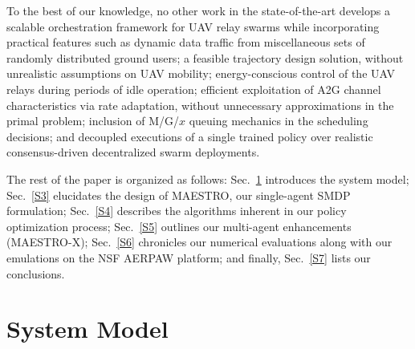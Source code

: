 \documentclass[10pt, twocolumn]{IEEEtran}
\theoremstyle{plain}
\theoremstyle{definition}
\theoremstyle{remark}
\begin{document}
To the best of our knowledge, no other work in the state-of-the-art develops a scalable orchestration framework for UAV relay swarms while incorporating practical features such as dynamic data traffic from miscellaneous sets of randomly distributed ground users; a feasible trajectory design solution, without unrealistic assumptions on UAV mobility; energy-conscious control of the UAV relays during periods of idle operation; efficient exploitation of A2G channel characteristics via rate adaptation, without unnecessary approximations in the primal problem; inclusion of M/G/$x$ queuing mechanics in the scheduling decisions; and decoupled executions of a single trained policy over realistic consensus-driven decentralized swarm deployments.

The rest of the paper is organized as follows: Sec.~\ref{S2} introduces the system model; Sec.~\ref{S3} elucidates the design of MAESTRO, our single-agent SMDP formulation; Sec.~\ref{S4} describes the algorithms inherent in our policy optimization process; Sec.~\ref{S5} outlines our multi-agent enhancements (MAESTRO-X); Sec.~\ref{S6} chronicles our numerical evaluations along with our emulations on the NSF AERPAW platform; and finally, Sec.~\ref{S7} lists our conclusions.
\vspace{-4mm}


\section{System Model}\label{S2}
\end{document}
